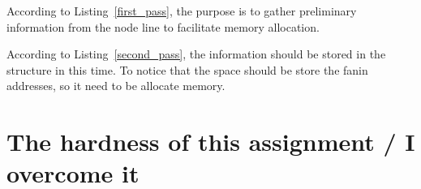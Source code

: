\documentclass{article}
\begin{document}



According to Listing~\ref{first_pass}, the purpose is to gather preliminary information from the node line to facilitate memory allocation.



According to Listing~\ref{second_pass}, the information should be stored in the structure in this time. To notice that the space should be store the fanin addresses, so it need to be allocate memory. 




\pagebreak
\section{The hardness of this assignment / I overcome it}
\end{document}
